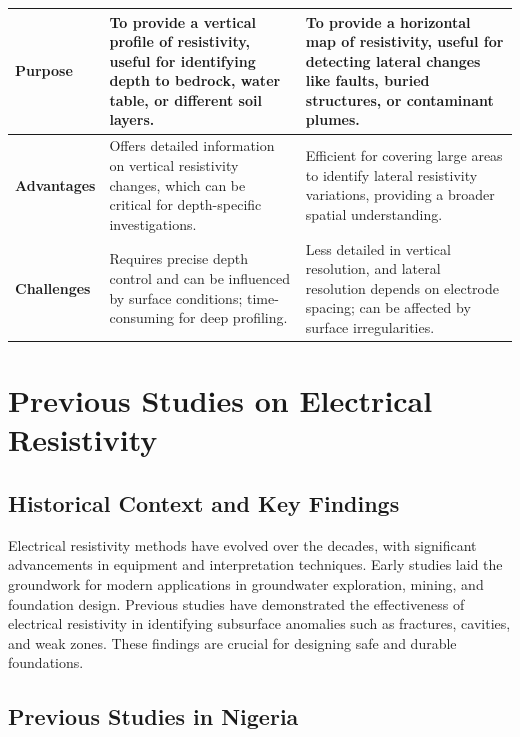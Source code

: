 \documentclass[12pt,a4paper]{report}
\begin{document}
\begin{tabular}{|>{\raggedright\arraybackslash}m{4cm}|>{\raggedright\arraybackslash}m{6cm}|>{\raggedright\arraybackslash}m{6cm}|}
    \textbf{Purpose} & To provide a vertical profile of resistivity, useful for identifying depth to bedrock, water table, or different soil layers. & To provide a horizontal map of resistivity, useful for detecting lateral changes like faults, buried structures, or contaminant plumes. \\ \hline
    
    \textbf{Advantages} & Offers detailed information on vertical resistivity changes, which can be critical for depth-specific investigations. & Efficient for covering large areas to identify lateral resistivity variations, providing a broader spatial understanding. \\ \hline
    
    \textbf{Challenges} & Requires precise depth control and can be influenced by surface conditions; time-consuming for deep profiling. & Less detailed in vertical resolution, and lateral resolution depends on electrode spacing; can be affected by surface irregularities. \\ \hline
\end{tabular}

\section{Previous Studies on Electrical Resistivity}

\subsection{Historical Context and Key Findings}
Electrical resistivity methods have evolved over the decades, with significant advancements in equipment and interpretation techniques. Early studies laid the groundwork for modern applications in groundwater exploration, mining, and foundation design. Previous studies have demonstrated the effectiveness of electrical resistivity in identifying subsurface anomalies such as fractures, cavities, and weak zones. These findings are crucial for designing safe and durable foundations.

\subsection{Previous Studies in Nigeria}
\end{document}
